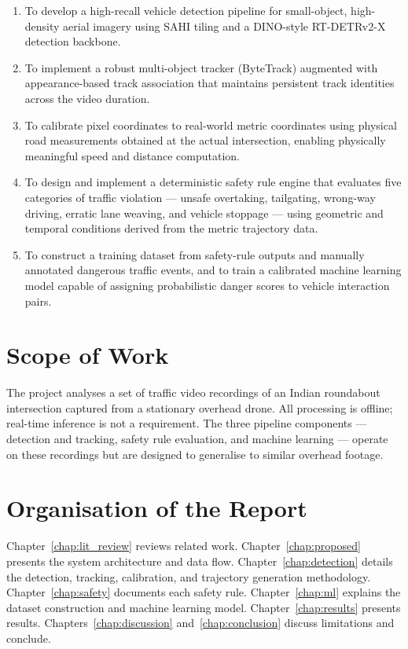 \documentclass[12pt,a4paper]{report}
\begin{document}
\begin{enumerate}
    \item To develop a high-recall vehicle detection pipeline for small-object, high-density
          aerial imagery using SAHI tiling and a DINO-style RT-DETRv2-X detection backbone.
    \item To implement a robust multi-object tracker (ByteTrack) augmented with appearance-based
          track association that maintains persistent track identities across the video duration.
    \item To calibrate pixel coordinates to real-world metric coordinates using physical
          road measurements obtained at the actual intersection, enabling physically
          meaningful speed and distance computation.
    \item To design and implement a deterministic safety rule engine that evaluates five
          categories of traffic violation --- unsafe overtaking, tailgating, wrong-way
          driving, erratic lane weaving, and vehicle stoppage --- using geometric and temporal
          conditions derived from the metric trajectory data.
    \item To construct a training dataset from safety-rule outputs and manually annotated
          dangerous traffic events, and to train a calibrated machine learning model capable
          of assigning probabilistic danger scores to vehicle interaction pairs.
\end{enumerate}

\section{Scope of Work}

The project analyses a set of traffic video recordings of an Indian roundabout intersection
captured from a stationary overhead drone.  All processing is offline; real-time inference
is not a requirement.  The three pipeline components --- detection and tracking, safety rule
evaluation, and machine learning --- operate on these recordings but are designed to generalise
to similar overhead footage.

\section{Organisation of the Report}

Chapter~\ref{chap:lit_review} reviews related work.
Chapter~\ref{chap:proposed} presents the system architecture and data flow.
Chapter~\ref{chap:detection} details the detection, tracking, calibration, and trajectory
generation methodology.
Chapter~\ref{chap:safety} documents each safety rule.
Chapter~\ref{chap:ml} explains the dataset construction and machine learning model.
Chapter~\ref{chap:results} presents results.
Chapters~\ref{chap:discussion} and~\ref{chap:conclusion} discuss limitations and conclude.
\clearpage\thispagestyle{empty}\newpage
\end{document}
